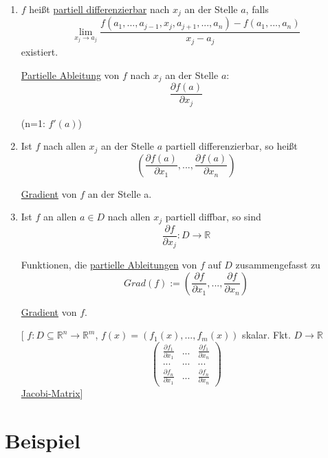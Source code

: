 \documentclass[a4paper, openany]{book}
\begin{document}
          \begin{enumerate}[label=(\alph*)]
            \item $f$ heißt \underline{partiell differenzierbar} nach $x_j$ an der Stelle $a$, falls \[ \lim_{x_j \rightarrow a_j} \frac{f(a_1, ..., a_{j-1}, x_j, a_{j+1}, ..., a_n) - f(a_1, ..., a_n)}{x_j-a_j} \] existiert.

            \par \medskip

            \underline{Partielle Ableitung} von $f$ nach $x_j$ an der Stelle $a$: \[ \frac{\partial f(a)}{\partial x_j} \]

            (n=1: $f'(a)$)

            \item Ist $f$ nach allen $x_j$ an der Stelle $a$ partiell differenzierbar, so heißt \[ (\frac{\partial f(a)}{\partial x_1}, ..., \frac{\partial f(a)}{\partial x_n}) \]

            \underline{Gradient} von $f$ an der Stelle a.

            \item Ist $f$ an allen $a \in D$ nach allen $x_j$ partiell diffbar, so sind \[ \frac{\partial f}{\partial x_j} : D \rightarrow \mathbb{R} \]

            Funktionen, die \underline{partielle Ableitungen} von $f$ auf $D$  zusammengefasst zu \[ Grad(f) := (\frac{\partial f}{\partial x_1}, ..., \frac{\partial f}{\partial x_n}) \]

            \underline{Gradient} von $f$.

            \par \medskip

            [ $f: D \subseteq \mathbb{R}^n \rightarrow \mathbb{R}^m$, $f(x) = (f_1(x), ..., f_m(x))$ skalar. Fkt. $D \rightarrow \mathbb{R}$ \[ \begin{pmatrix}\frac{\partial f_1}{\partial x_1} & ... & \frac{\partial f_1}{\partial x_n} \\ ... & ... & ... \\ \frac{\partial f_n}{\partial x_1} & ... & \frac{\partial f_n}{\partial x_n} \end{pmatrix} \] \underline{Jacobi-Matrix}]
          \end{enumerate}

          \section{Beispiel}
\end{document}
